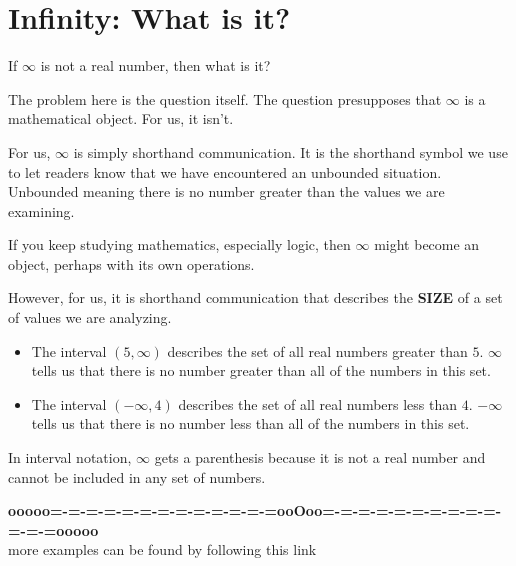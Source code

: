 \documentclass{ximera}
\begin{document}
\section{Infinity: What is it?}


If $\infty$ is not a real number, then what is it?


The problem here is the question itself.  The question presupposes that $\infty$ is a mathematical object.  For us, it isn't.   

For us, $\infty$ is simply shorthand communication.  It is the shorthand symbol we use to let readers know that we have encountered an unbounded situation. Unbounded meaning there is no number greater than the values we are examining.


If you keep studying mathematics, especially logic, then $\infty$ might become an object, perhaps with its own operations.

However, for us, it is shorthand communication that describes the \textbf{SIZE} of a set of values we are analyzing.







\begin{example}


\begin{itemize}
\item The interval $(5, \infty)$ describes the set of all real numbers greater than $5$.  $\infty$ tells us that there is no number greater than all of the numbers in this set.



\item The interval $(-\infty, 4)$ describes the set of all real numbers less than $4$.  $-\infty$ tells us that there is no number less than all of the numbers in this set.
\end{itemize}




\end{example}
In interval notation, $\infty$ gets a parenthesis because it is not a real number and cannot be included in any set of numbers.



























\begin{center}
\textbf{\textcolor{green!50!black}{ooooo=-=-=-=-=-=-=-=-=-=-=-=-=ooOoo=-=-=-=-=-=-=-=-=-=-=-=-=ooooo}} \\

more examples can be found by following this link\\ 

\end{center}
\end{document}
